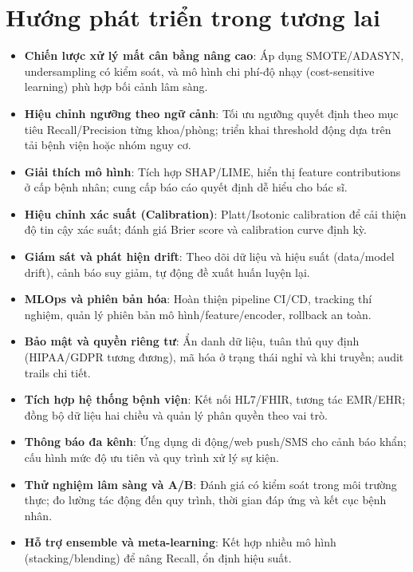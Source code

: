 ﻿\documentclass{article}
\begin{document}
\section{Hướng phát triển trong tương lai}
\begin{itemize}
    \item \textbf{Chiến lược xử lý mất cân bằng nâng cao}: Áp dụng SMOTE/ADASYN, undersampling có kiểm soát, và mô hình chi phí-độ nhạy (cost-sensitive learning) phù hợp bối cảnh lâm sàng.
    \item \textbf{Hiệu chỉnh ngưỡng theo ngữ cảnh}: Tối ưu ngưỡng quyết định theo mục tiêu Recall/Precision từng khoa/phòng; triển khai threshold động dựa trên tải bệnh viện hoặc nhóm nguy cơ.
    \item \textbf{Giải thích mô hình}: Tích hợp SHAP/LIME, hiển thị feature contributions ở cấp bệnh nhân; cung cấp báo cáo quyết định dễ hiểu cho bác sĩ.
    \item \textbf{Hiệu chỉnh xác suất (Calibration)}: Platt/Isotonic calibration để cải thiện độ tin cậy xác suất; đánh giá Brier score và calibration curve định kỳ.
    \item \textbf{Giám sát và phát hiện drift}: Theo dõi dữ liệu và hiệu suất (data/model drift), cảnh báo suy giảm, tự động đề xuất huấn luyện lại.
    \item \textbf{MLOps và phiên bản hóa}: Hoàn thiện pipeline CI/CD, tracking thí nghiệm, quản lý phiên bản mô hình/feature/encoder, rollback an toàn.
    \item \textbf{Bảo mật và quyền riêng tư}: Ẩn danh dữ liệu, tuân thủ quy định (HIPAA/GDPR tương đương), mã hóa ở trạng thái nghỉ và khi truyền; audit trails chi tiết.
    \item \textbf{Tích hợp hệ thống bệnh viện}: Kết nối HL7/FHIR, tương tác EMR/EHR; đồng bộ dữ liệu hai chiều và quản lý phân quyền theo vai trò.
    \item \textbf{Thông báo đa kênh}: Ứng dụng di động/web push/SMS cho cảnh báo khẩn; cấu hình mức độ ưu tiên và quy trình xử lý sự kiện.
    \item \textbf{Thử nghiệm lâm sàng và A/B}: Đánh giá có kiểm soát trong môi trường thực; đo lường tác động đến quy trình, thời gian đáp ứng và kết cục bệnh nhân.
    \item \textbf{Hỗ trợ ensemble và meta-learning}: Kết hợp nhiều mô hình (stacking/blending) để nâng Recall, ổn định hiệu suất.
\end{itemize}
\end{document}
